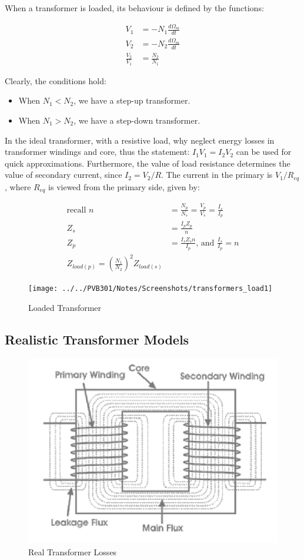 \documentclass{book}
\begin{document}
When a transformer is loaded, its behaviour is defined by the functions:

\begin{align*}
	V_1 &= -N_1 \frac{d\Omega_m}{dt} \\
	V_2 &= -N_2 \frac{d\Omega_m}{dt} \\
	\frac{V_2}{V_1} &= \frac{N_2}{N_1} 
\end{align*}

Clearly, the conditions hold:

\begin{itemize}
	\item When $N_1 <N_2$, we have a step-up transformer.
	\item When $N_1 > N_2$, we have a step-down transformer.
\end{itemize}

In the ideal transformer, with a resistive load, why neglect energy losses in transformer windings and core, thus the statement: $I_1 V_1 = I_2 V_2$ can be used for quick approximations. Furthermore, the value of load resistance determines the value of secondary current, since $I_2 = V_2 /R$. The current in the primary is $V_1/R_{eq}$, where $R_{eq}$ is viewed from the primary side, given by:

\begin{align*}
	\text{recall } n &= \frac{N_p}{N_s} = \frac{V_p}{V_s} = \frac{I_s}{I_p}\\
	Z_s &=  \frac{I_p Z_p}{n} \\
	Z_p &= \frac{I_s Z_s n}{I_p} \text{, and } \frac{I_s}{I_p} = n \\
	Z_{load(p)} = (\frac{N_1}{N_2})^2 Z_{load(s)}
\end{align*}
\begin{figure}[h]
	\centering
	\texttt{[image: ../../PVB301/Notes/Screenshots/transformers\_load1]}
	\caption{Loaded Transformer}
	\label{fig:transformersload1}
\end{figure}

\subsection{Realistic Transformer Models}

\begin{figure}
	\centering
	\includegraphics[width=0.4\linewidth]{Screenshots/real_transformer}
	\caption{Real Transformer Losses}
	\label{fig:realtransformer}
\end{figure}
\end{document}
